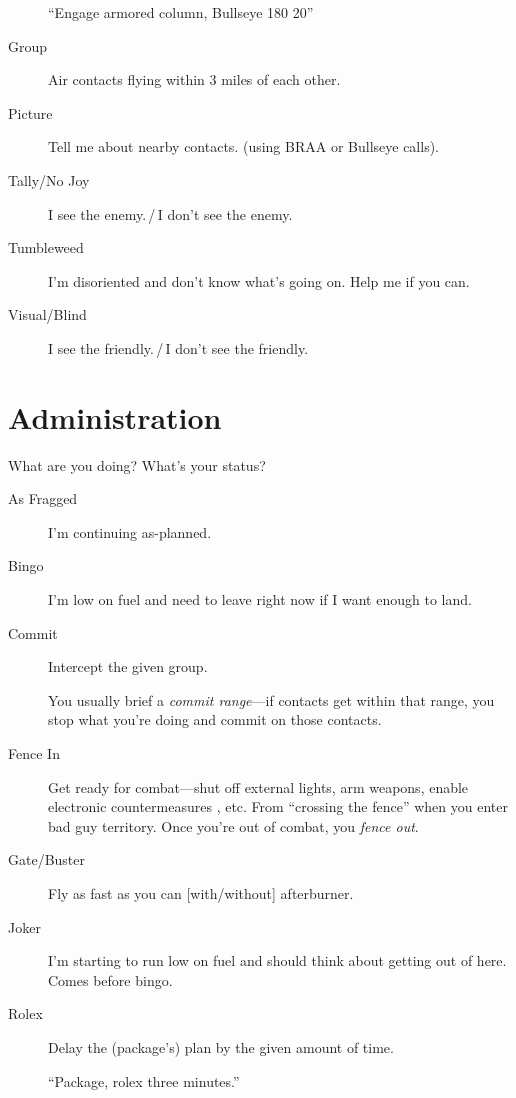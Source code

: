 \begin{description}
    ``Engage armored column, Bullseye 180 20''

\item[Group] Air contacts flying within 3 miles of each other.

\item[Picture] Tell me about nearby contacts.
    (using BRAA or Bullseye calls).

\item[Tally/No Joy] I see the enemy.\,/\,I don't see the enemy.

\item[Tumbleweed] I'm disoriented and don't know what's going on.
    Help me if you can.

\item[Visual/Blind] I see the friendly.\,/\,I don't see the friendly.
\end{description}

\section{Administration}

What are you doing? What's your status?
\begin{description}

\item[As Fragged] I'm continuing as-planned.

\item[Bingo] I'm low on fuel and need to leave right now if I want enough
    to land.

\item[Commit] Intercept the given group.

    You usually brief a \emph{commit range}---if contacts get within that range,
    you stop what you're doing and commit on those contacts.

\item[Fence In] Get ready for combat---shut off external lights,
    arm weapons, enable electronic countermeasures , etc.
    From ``crossing the fence'' when you enter bad guy territory.
    Once you're out of combat, you \emph{fence out}.

\item[Gate/Buster] Fly as fast as you can [with/without] afterburner.

\item[Joker] I'm starting to run low on fuel and should think about getting
    out of here. Comes before bingo.

\item[Rolex] Delay the (package's) plan by the given amount of time.

    ``Package, rolex three minutes.''
\end{description}

